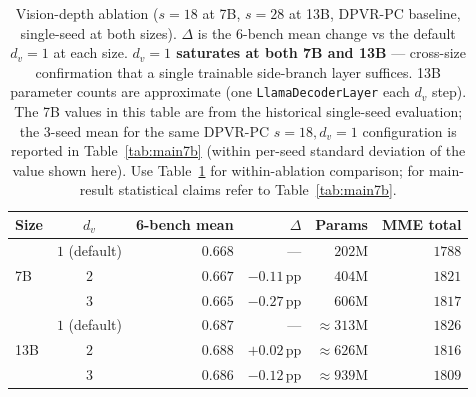 \documentclass[a4paper,fleqn,review]{cas-sc}
\newcommand{\dpvrpc}{DPVR-PC}
\begin{document}
\begin{table}[t]
\centering
\caption{Vision-depth ablation ($s = 18$ at 7B, $s = 28$ at 13B,
\dpvrpc{} baseline, single-seed at both sizes). $\Delta$ is the
6-bench mean change vs the default $d_v = 1$ at each size.
\textbf{$d_v = 1$ saturates at both 7B and 13B} --- cross-size
confirmation that a single trainable side-branch layer suffices.
13B parameter counts are approximate (one \texttt{LlamaDecoderLayer}
each $d_v$ step). The 7B values in this table are from the
historical single-seed evaluation; the 3-seed mean for the same
\dpvrpc{} $s = 18, d_v = 1$ configuration is reported in
Table~\ref{tab:main7b} (within per-seed standard deviation of
the value shown here). Use Table~\ref{tab:depth} for within-ablation
comparison; for main-result statistical claims refer to
Table~\ref{tab:main7b}.}
\label{tab:depth}
\footnotesize
\setlength{\tabcolsep}{4pt}
\begin{tabular}{lcrrrr}
\toprule
Size & $d_v$ & 6-bench mean & $\Delta$ & Params & MME total \\
\midrule
\multirow{3}{*}{7B}  & \cellcolor[RGB]{236,244,252}$1$ (default) & \cellcolor[RGB]{236,244,252}\textbf{$0.668$} & \cellcolor[RGB]{236,244,252}---            & \cellcolor[RGB]{236,244,252}$202$M & \cellcolor[RGB]{236,244,252}$1788$ \\
                     & $2$           & $0.667$          & $-0.11$\,pp    & $404$M & $1821$ \\
                     & $3$           & $0.665$          & $-0.27$\,pp    & $606$M & $1817$ \\
\midrule
\multirow{3}{*}{13B} & \cellcolor[RGB]{236,244,252}$1$ (default) & \cellcolor[RGB]{236,244,252}\textbf{$0.687$} & \cellcolor[RGB]{236,244,252}---            & \cellcolor[RGB]{236,244,252}$\approx 313$M & \cellcolor[RGB]{236,244,252}$1826$ \\
                     & $2$           & $0.688$          & $+0.02$\,pp    & $\approx 626$M & $1816$ \\
                     & $3$           & $0.686$          & $-0.12$\,pp    & $\approx 939$M & $1809$ \\
\bottomrule
\end{tabular}
\end{table}
\end{document}
